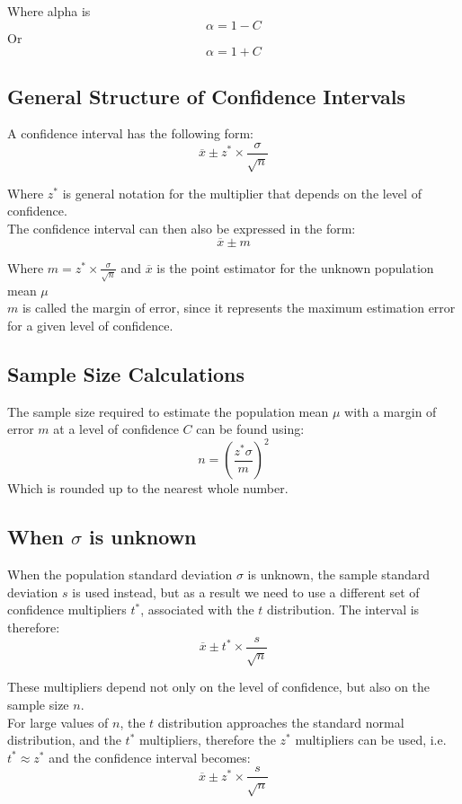 \documentclass[12pt letter]{report}
\begin{document}
Where alpha is
\[
  \alpha = 1 - C
\]
Or
\[
  \alpha = 1 + C
\]
\subsection{General Structure of Confidence Intervals}

A confidence interval has the following form:
\[
  \overline{x} \pm z^{*} \times \frac{\sigma }{\sqrt{n}}
\]

Where $z^*$ is general notation for the multiplier that depends on the level of confidence. \\
The confidence interval can then also be expressed in the form:
\[
  \overline{x} \pm m
\]

Where $m = z^* \times \frac{\sigma}{\sqrt{n}}$ and $\overline{x}$ is the point estimator for the unknown population mean $\mu $\\
$m$ is called the margin of error, since it represents the maximum estimation error for a given level of confidence.


\subsection{Sample Size Calculations}

The sample size required to estimate the population mean $\mu $ with a margin of error $m$ at a level of confidence $C$ can be found using:
\[
  n = \left( \frac{z^*  \sigma }{m} \right)^2
\]
Which is rounded up to the nearest whole number.

\subsection{When $\sigma $ is unknown}

When the population standard deviation $\sigma $ is unknown, the sample standard deviation $s$ is used instead, but as a
result we need to use a different set of confidence multipliers $t^*$, associated with the $t$ distribution. The
interval is therefore:
\[
  \overline{x} \pm t^* \times \frac{s}{\sqrt{n}}
\]

These multipliers depend not only on the level of confidence, but also on the sample size $n$. \\
For large values of $n$, the $t$ distribution approaches the standard normal distribution, and the $t^*$ multipliers,
therefore the $z^*$ multipliers can be used, i.e. $t^* \approx z^*$ and the confidence interval becomes:
\[
  \overline{x} \pm z^* \times \frac{s}{\sqrt{n}}
\]
\end{document}
